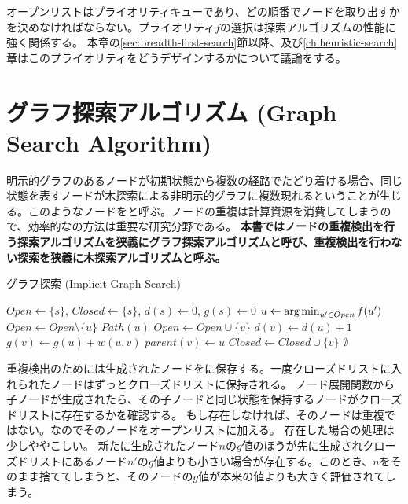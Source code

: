 オープンリストはプライオリティキューであり、どの順番でノードを取り出すかを決めなければならない。プライオリティ$f$の選択は探索アルゴリズムの性能に強く関係する。
本章の\ref{sec:breadth-first-search}節以降、及び\ref{ch:heuristic-search}章はこのプライオリティをどうデザインするかについて議論をする。



\section{グラフ探索アルゴリズム (Graph Search Algorithm)}
\label{sec:graph-search-algorithm}


明示的グラフのあるノードが初期状態から複数の経路でたどり着ける場合、同じ状態を表すノードが木探索による非明示的グラフに複数現れるということが生じる。このようなノードをと呼ぶ。ノードの重複は計算資源を消費してしまうので、効率的なの方法は重要な研究分野である。
{\bf 本書ではノードの重複検出を行う探索アルゴリズムを狭義にグラフ探索アルゴリズムと呼び、重複検出を行わない探索を狭義に木探索アルゴリズムと呼ぶ。}


\begin{algorithm}[tbh]
\caption{グラフ探索 (Implicit Graph Search)}
\label{alg:implicit-graph-search}
	$Open \leftarrow \{s\}$, $Closed \leftarrow \{s\}$, $d(s) \leftarrow 0$, $g(s) \leftarrow 0$\;
	 {
                $u \leftarrow \operatorname*{arg\,min}_{u' \in Open} f(u')$ \;
		$Open \leftarrow Open \setminus \{u\} $\;
		 {
			\Return $Path(u)$\;
		}
		 {
		   {
                    $Open \leftarrow Open \cup \{v\}$\;
		    $d(v) \leftarrow d(u) + 1$\;
		    $g(v) \leftarrow g(u) + w(u, v)$\;
                    $parent(v) \leftarrow u$\;
                  }
		   {
                    $Closed \leftarrow Closed \cup \{v\}$\;
                  }
		}
 	}
	\Return $\emptyset$\;
\end{algorithm}


重複検出のためには生成されたノードをに保存する。一度クローズドリストに入れられたノードはずっとクローズドリストに保持される。
ノード展開関数から子ノードが生成されたら、その子ノードと同じ状態を保持するノードがクローズドリストに存在するかを確認する。
もし存在しなければ、そのノードは重複ではない。なのでそのノードをオープンリストに加える。
存在した場合の処理は少しややこしい。
新たに生成されたノード$n$の$g$値のほうが先に生成されクローズドリストにあるノード$n'$の$g$値よりも小さい場合が存在する。このとき、$n$をそのまま捨ててしまうと、そのノードの$g$値が本来の値よりも大きく評価されてしまう。

